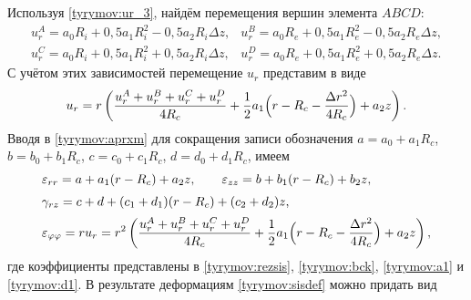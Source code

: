 Используя \eqref{tyrymov:ur_3}, найдём перемещения вершин элемента $ABCD$: 
$$%
    \begin{array}{ll}
      u_r^A=a_0R_i+0,5a_1R_i^2-0,5a_2R_i\Delta z, &
      u_r^B=a_0R_e+0,5a_1R_e^2-0,5a_2R_e\Delta z, \\
      u_r^C=a_0R_i+0,5a_1R_i^2+0,5a_2R_i\Delta z, &
      u_r^D=a_0R_e+0,5a_1R_e^2+0,5a_2R_e\Delta z.
    \end{array}
$$%
 С учётом этих зависимостей перемещение $u_r$ представим в виде
\begin{equation}\label{tyrymov:UR}
    u_r=r\left(\frac{u_r^A+u_r^B+u_r^C+u_r^D}{4R_c}+\frac{1}{2}a_1\Bigl(r-R_c-\frac{\Delta
    r^2}{4R_c}\Bigr)+a_2z\right).
\end{equation}
Вводя в \eqref{tyrymov:aprxm} для сокращения записи обозначения
$a=a_0+a_1R_c$, 
$b=b_0+b_1R_c$, 
$c=c_0+c_1R_c$,
$d=d_0+d_1R_c$,
имеем
\begin{equation}\label{tyrymov:sisdef}
    \begin{array}{l}
      \varepsilon_{rr}=a+a_1(r-R_c)+a_2z,\qquad \varepsilon_{zz}=b+b_1(r-R_c)+b_2z, \\[2mm] 
     \gamma_{rz}=c+d+(c_1+d_1)(r-R_c)+(c_2+d_2)z, \\[2mm]
     \displaystyle \varepsilon_{\varphi\varphi}=ru_r=
     r^2\left(\frac{u_r^A+u_r^B+u_r^C+u_r^D}{4R_c}+
     \frac{1}{2}a_1\Bigl(r-R_c-\frac{\Delta r^2}{4R_c}\Bigr)+a_2z\right), \\
    \end{array}
\end{equation}
где коэффициенты представлены в \eqref{tyrymov:rezsis}, \eqref{tyrymov:bck}, \eqref{tyrymov:a1} и \eqref{tyrymov:d1}. 
В результате деформациям \eqref{tyrymov:sisdef} можно придать вид
